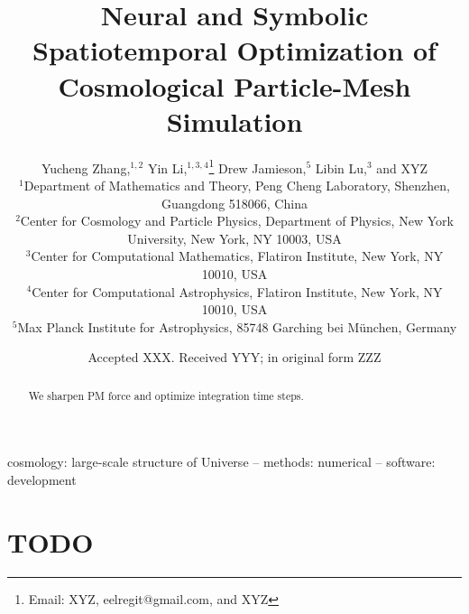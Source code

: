 \documentclass[usenatbib]{mnras}
\title[Spatiotemporally Optimized Simulation]
{Neural and Symbolic Spatiotemporal Optimization of Cosmological
Particle-Mesh Simulation}
\author[Zhang, Li, Jamieson, et al.]{
%
Yucheng Zhang,$^{1, 2}$
%
Yin Li,$^{1, 3, 4}$\thanks{Email: XYZ, eelregit@gmail.com, and XYZ}
%
Drew Jamieson,$^{5}$
%
Libin Lu,$^{3}$
%
and XYZ
%
\\$^1$Department of Mathematics and Theory, Peng Cheng Laboratory,
Shenzhen, Guangdong 518066, China
%
\\$^2$Center for Cosmology and Particle Physics, Department of Physics,
New York University, New York, NY 10003, USA
%
\\$^3$Center for Computational Mathematics, Flatiron Institute, New
York, NY 10010, USA
%
\\$^4$Center for Computational Astrophysics, Flatiron Institute, New
York, NY 10010, USA
%
\\$^5$Max Planck Institute for Astrophysics, 85748 Garching bei
M\"unchen, Germany
}
\date{Accepted XXX. Received YYY; in original form ZZZ}
\begin{document}
\label{firstpage}
\pagerange{\pageref{firstpage}--\pageref{lastpage}}
\maketitle



\begin{abstract}
We sharpen PM force and optimize integration time steps.
\end{abstract}

\begin{keywords}
cosmology: large-scale structure of Universe
-- methods: numerical
-- software: development
\end{keywords}



\section*{TODO}
\end{document}

